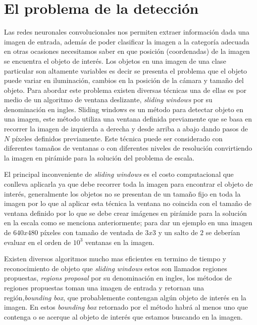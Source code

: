 \section{El problema de la detección}\label{sub:problema_deteccion}


Las redes neuronales convolucionales nos permiten extraer información dada una imagen de entrada, además de poder clasificar la imagen a la categoría adecuada en otras ocasiones necesitamos saber en que posición (coordenadas) de la imagen se encuentra el objeto de interés. Los objetos en una imagen de una clase particular son altamente variables es decir se presenta el problema que el objeto puede variar en iluminación, cambios en la posición de la cámara y tamaño del objeto. Para abordar este problema existen diversas técnicas una de ellas es por medio de un algoritmo de ventana deslizante, \textit{sliding windows} por su denominación en ingles. Sliding windows es un método para detectar objeto en una imagen, este método utiliza una ventana definida previamente que se basa en recorrer la imagen de izquierda a derecha y desde arriba a abajo dando pasos de $N$ píxeles definidos previamente. Este técnica puede ser considerado con diferentes tamaños de ventanas o con diferentes niveles de resolución convirtiendo la imagen en pirámide para la solución del problema de escala. 

El principal inconveniente de \textit{sliding windows} es el costo computacional que conlleva aplicarla ya que debe recorrer toda la imagen para encontrar el objeto de interés, generalmente los objetos no se presentan de un tamaño fijo en toda la imagen por lo que al aplicar esta técnica la ventana no coincida con el tamaño de ventana definido por lo que se debe crear imágenes en pirámide para la solución en la escala como se menciona anteriormente; para dar un ejemplo en una imagen de $640 x 480$ píxeles con tamaño de ventada de $ 3 x 3$ y un salto de $2$ se deberían evaluar en el orden de $10^3$ ventanas en la imagen.

Existen diversos algoritmos mucho mas eficientes en termino de tiempo y reconocimiento de objeto que \textit{sliding windows} estos son llamados regiones propuestas, \textit{regions proposal} por su denominación en ingles, los métodos de regiones propuestas toman una imagen de entrada y retornan una región,\textit{bounding box},  que probablemente contengan algún objeto de interés en la imagen.  En estos \textit{bounding box} retornado por el método habrá al menos uno que contenga o se acerque al objeto de interés que estamos buscando en la imagen.

